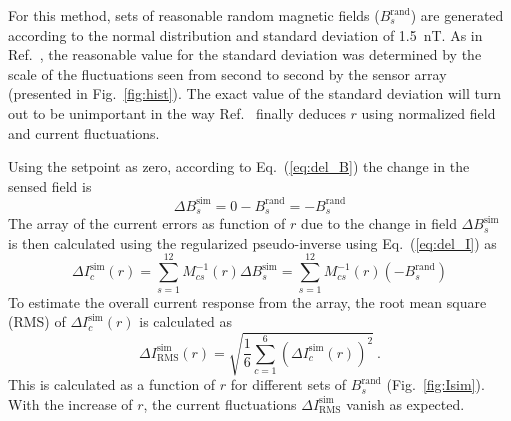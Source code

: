 For this method, sets of reasonable random magnetic fields ($B_s^{\text{rand}}$) are generated according to the normal distribution and standard deviation of 1.5~nT. As in Ref.~\cite{bea}, the reasonable value for the standard deviation was determined by the scale of the fluctuations seen from second to second by the sensor array (presented in Fig.~\ref{fig:hist}). The exact value of the standard deviation will turn out to be unimportant in the way Ref.~\cite{bea} finally deduces $r$ using normalized field and current fluctuations.

Using the setpoint as zero, according to Eq.~(\ref{eq:del_B}) the change in the sensed field is  
\begin{equation}\label{eq:del_Bs}
    \Delta B_s^{\text{sim}} = 0 - B_s^{\text{rand}}=-B_s^{\text{rand}}
\end{equation}
The array of the current errors  as function of $r$ due to the change in field $\Delta B_s^{\text{sim}}$ is then calculated using the regularized pseudo-inverse using Eq.~(\ref{eq:del_I}) as
\begin{equation}\label{eq:del_Is}
    \Delta I_c^{\text{sim}}(r) =\sum_{s=1}^{12} M^{-1}_{cs}(r) \Delta B_s^{\text{sim}}=\sum_{s=1}^{12} M^{-1}_{cs}(r) (-B_s^{\text{rand}})
\end{equation}
To estimate the overall current response from the array, the root mean square (RMS) of $\Delta I_c^{\text{sim}}(r)$ is calculated as
\begin{equation}\label{eq:delta_Isim_rms}
     \Delta I_{\text{RMS}}^{\text{sim}}(r)= \sqrt{\frac{1}{6}\sum_{c=1}^6 (\Delta I_c^{\text{sim}}(r))^2}~\text{.}
\end{equation}
This is calculated as a function of $r$ for different sets of $B_s^{\text{rand}}$ (Fig.~\ref{fig:Isim}). With the increase of $r$, the current fluctuations $\Delta I_{\text{RMS}}^{\text{sim}}$ vanish as expected.




